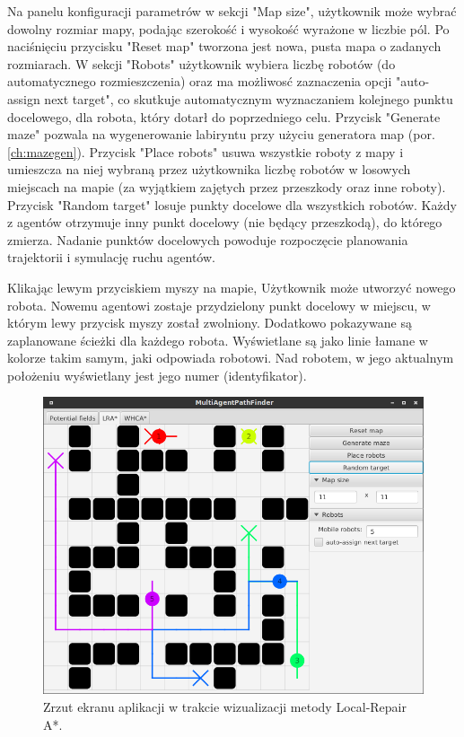 Na panelu konfiguracji parametrów w sekcji "Map size", użytkownik może wybrać dowolny rozmiar mapy, podając szerokość i wysokość wyrażone w liczbie pól.
Po naciśnięciu przycisku "Reset map" tworzona jest nowa, pusta mapa o zadanych rozmiarach.
W sekcji "Robots" użytkownik wybiera liczbę robotów (do automatycznego rozmieszczenia) oraz ma możliwosć zaznaczenia opcji "auto-assign next target", co skutkuje automatycznym wyznaczaniem kolejnego punktu docelowego, dla robota, który dotarł do poprzedniego celu.
Przycisk "Generate maze" pozwala na wygenerowanie labiryntu przy użyciu generatora map (por. \ref{ch:mazegen}).
Przycisk "Place robots" usuwa wszystkie roboty z mapy i umieszcza na niej wybraną przez użytkownika liczbę robotów w losowych miejscach na mapie (za wyjątkiem zajętych przez przeszkody oraz inne roboty).
Przycisk "Random target" losuje punkty docelowe dla wszystkich robotów. Każdy z agentów otrzymuje inny punkt docelowy (nie będący przeszkodą), do którego zmierza. Nadanie punktów docelowych powoduje rozpoczęcie planowania trajektorii i symulację ruchu agentów.

Klikając lewym przyciskiem myszy na mapie, Użytkownik może utworzyć nowego robota. Nowemu agentowi zostaje przydzielony punkt docelowy w miejscu, w którym lewy przycisk myszy został zwolniony.
Dodatkowo pokazywane są zaplanowane ścieżki dla każdego robota. Wyświetlane są jako linie łamane w kolorze takim samym, jaki odpowiada robotowi.
Nad robotem, w jego aktualnym położeniu wyświetlany jest jego numer (identyfikator).

\begin{figure}
	\centering
	\includegraphics[width=0.8\columnwidth]{img/robopath/ui-lra}
	\caption{Zrzut ekranu aplikacji w trakcie wizualizacji metody Local-Repair A*.}
	\label{fig:robopath-ui-lra}
\end{figure}


